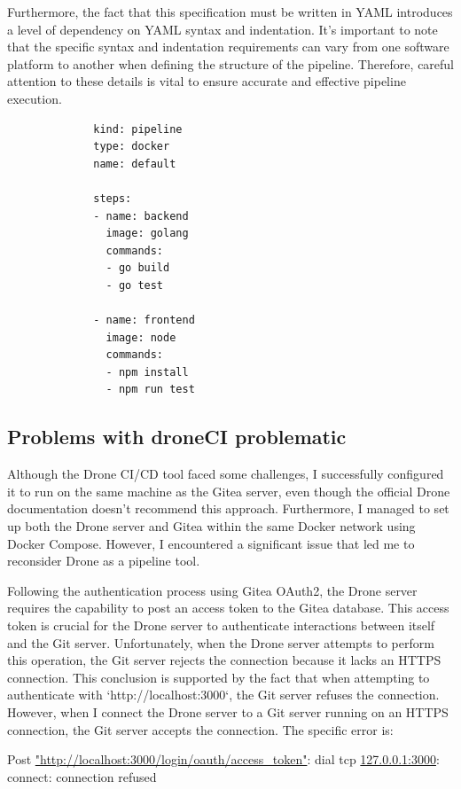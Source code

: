 Furthermore, the fact that this specification must be written in YAML introduces a 
level of dependency on YAML syntax and indentation. It's important to note that the 
specific syntax and indentation requirements can vary from one software platform to another when defining the structure of the pipeline. 
Therefore, careful attention to these details is vital to ensure accurate and effective pipeline execution.

\begin{figure}
    \begin{verbatim}
        kind: pipeline
        type: docker
        name: default
            
        steps:
        - name: backend
          image: golang
          commands:
          - go build
          - go test
            
        - name: frontend
          image: node
          commands:
          - npm install
          - npm run test
      \end{verbatim}
\end{figure}

\subsection{Problems with droneCI problematic}
Although the Drone CI/CD tool faced some challenges, I successfully configured it to run on the same machine as the Gitea server, 
even though the official Drone documentation doesn't recommend this approach. Furthermore, 
I managed to set up both the Drone server and Gitea within the same Docker network using Docker Compose. 
However, I encountered a significant issue that led me to reconsider Drone as a pipeline tool.

Following the authentication process using Gitea OAuth2, the Drone server requires the capability to post an access token to the Gitea database. 
This access token is crucial for the Drone server to authenticate interactions between itself and the Git server. 
Unfortunately, when the Drone server attempts to perform this operation, the Git server rejects the connection because it lacks an HTTPS connection. 
This conclusion is supported by the fact that when attempting to authenticate with `http://localhost:3000`, 
the Git server refuses the connection. However, when I connect the Drone server to a Git server running on an HTTPS connection, 
the Git server accepts the connection. The specific error is:
\begin{center}
  Post \url{"http://localhost:3000/login/oauth/access_token"}: dial tcp \url{127.0.0.1:3000}: connect: connection refused
\end{center}

